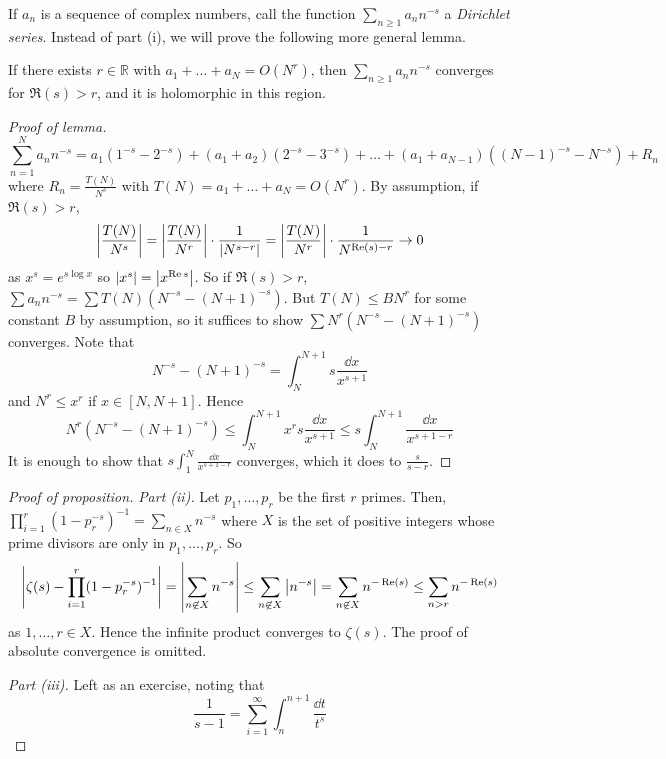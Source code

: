 If \( a_n \) is a sequence of complex numbers, call the function \( \sum_{n \geq 1} a_n n^{-s} \) a \emph{Dirichlet series}.
Instead of part (i), we will prove the following more general lemma.
\begin{lemma}
    If there exists \( r \in \mathbb R \) with \( a_1 + \dots + a_N = O(N^r) \), then \( \sum_{n \geq 1} a_n n^{-s} \) converges for \( \Re(s) > r \), and it is holomorphic in this region.
\end{lemma}
\begin{proof}[Proof of lemma]
    \[ \sum_{n=1}^N a_n n^{-s} = a_1 (1^{-s} - 2^{-s}) + (a_1 + a_2) (2^{-s} - 3^{-s}) + \dots + (a_1 + a_{N-1})((N-1)^{-s} - N^{-s}) + R_n \]
    where \( R_n = \frac{T(N)}{N^s} \) with \( T(N) = a_1 + \dots + a_N = O(N^r) \).
    By assumption, if \( \Re(s) > r \),
    \[ \abs{\frac{T(N)}{N^s}} = \abs{\frac{T(N)}{N^r}} \cdot \frac{1}{\abs{N^{s-r}}} = \abs{\frac{T(N)}{N^r}} \cdot \frac{1}{N^{\Re(s) - r}} \to 0 \]
    as \( x^s = e^{s \log x} \) so \( \abs{x^s} = \abs{x^{\Re s}} \).
    So if \( \Re(s) > r \), \( \sum a_n n^{-s} = \sum T(N) (N^{-s} - (N+1)^{-s}) \).
    But \( T(N) \leq BN^r \) for some constant \( B \) by assumption, so it suffices to show \( \sum N^r (N^{-s} - (N+1)^{-s}) \) converges.
    Note that
    \[ N^{-s} - (N+1)^{-s} = \int_N^{N+1} s \frac{\dd{x}}{x^{s+1}} \]
    and \( N^r \leq x^r \) if \( x \in [N, N+1] \).
    Hence
    \[ N^r (N^{-s} - (N+1)^{-s}) \leq \int_N^{N+1} x^r s \frac{\dd{x}}{x^{s+1}} \leq s \int_N^{N+1} \frac{\dd{x}}{x^{s+1-r}} \]
    It is enough to show that \( s\int_1^N \frac{\dd{x}}{x^{s+1-r}} \) converges, which it does to \( \frac{s}{s-r} \).
\end{proof}
\begin{proof}[Proof of proposition]
    \emph{Part (ii).}
    Let \( p_1, \dots, p_r \) be the first \( r \) primes.
    Then, \( \prod_{i=1}^r (1 - p_r^{-s})^{-1} = \sum_{n \in X} n^{-s} \) where \( X \) is the set of positive integers whose prime divisors are only in \( p_1, \dots, p_r \).
    So
    \[ \abs{\zeta(s) - \prod_{i=1}^r (1 - p_r^{-s})^{-1}} = \abs{\sum_{n \not\in X} n^{-s}} \leq \sum_{n \not\in X} \abs{n^{-s}} = \sum_{n \not\in X} n^{-\Re(s)} \leq \sum_{n > r} n^{-\Re(s)} \]
    as \( 1, \dots, r \in X \).
    Hence the infinite product converges to \( \zeta(s) \).
    The proof of absolute convergence is omitted.

    \emph{Part (iii).}
    Left as an exercise, noting that
    \[ \frac{1}{s-1} = \sum_{i=1}^\infty \int_n^{n+1} \frac{\dd{t}}{t^s} \]
\end{proof}

